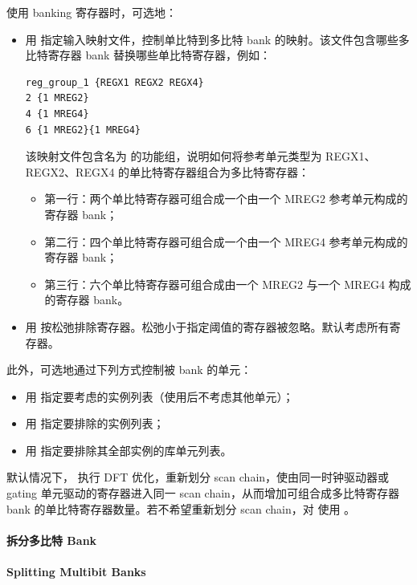 使用  banking 寄存器时，可选地：
\begin{itemize}
  \item 用  指定输入映射文件，控制单比特到多比特 bank 的映射。该文件包含哪些多比特寄存器 bank 替换哪些单比特寄存器，例如：
\begin{lstlisting}
reg_group_1 {REGX1 REGX2 REGX4}
2 {1 MREG2}
4 {1 MREG4}
6 {1 MREG2}{1 MREG4}
\end{lstlisting}
        该映射文件包含名为  的功能组，说明如何将参考单元类型为 REGX1、REGX2、REGX4 的单比特寄存器组合为多比特寄存器：
        \begin{itemize}
          \item 第一行：两个单比特寄存器可组合成一个由一个 MREG2 参考单元构成的寄存器 bank；
          \item 第二行：四个单比特寄存器可组合成一个由一个 MREG4 参考单元构成的寄存器 bank；
          \item 第三行：六个单比特寄存器可组合成由一个 MREG2 与一个 MREG4 构成的寄存器 bank。
        \end{itemize}
  \item 用  按松弛排除寄存器。松弛小于指定阈值的寄存器被忽略。默认考虑所有寄存器。
\end{itemize}

此外，可选地通过下列方式控制被 bank 的单元：
\begin{itemize}
  \item 用  指定要考虑的实例列表（使用后不考虑其他单元）；
  \item 用  指定要排除的实例列表；
  \item 用  指定要排除其全部实例的库单元列表。
\end{itemize}

默认情况下， 执行 DFT 优化，重新划分 scan chain，使由同一时钟驱动器或 gating 单元驱动的寄存器进入同一 scan chain，从而增加可组合成多比特寄存器 bank 的单比特寄存器数量。若不希望重新划分 scan chain，对  使用 。

\paragraph{拆分多比特 Bank}
\paragraph*{Splitting Multibit Banks}

